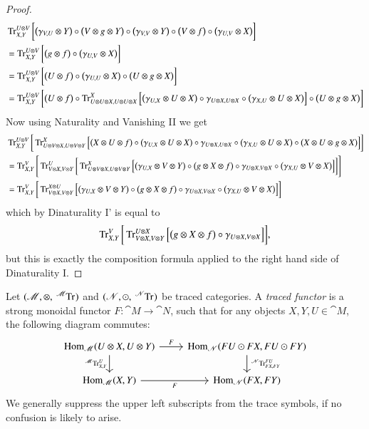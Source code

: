 \documentclass[12pt,oneside,article,draft]{memoir}
\begin{document}
{\begin{proof}
{ \begin{align*}
  &\operatorname{Tr}^{U\otimes V}_{X,Y}\bigg[\big(\gamma_{V,U}\otimes Y\big)\circ\big(V\otimes g\otimes Y\big)\circ\big(\gamma_{V,V}\otimes Y\big)\circ\big(V\otimes f\big)\circ\big(\gamma_{U,V}\otimes X\big)\bigg]\\
  &=\operatorname{Tr}^{U\otimes V}_{X,Y}\bigg[\big(g\otimes f\big)\circ\big(\gamma_{U,V}\otimes X\big)\bigg]\\
  &=\operatorname{Tr}^{U\otimes V}_{X,Y}\bigg[\big(U\otimes f\big)\circ\big(\gamma_{U,U}\otimes X\big)\circ\big(U\otimes g\otimes X\big)\bigg]\\
  &=\operatorname{Tr}^{U\otimes V}_{X,Y}\bigg[\big(U\otimes f\big)\circ\operatorname{Tr}^X_{U\otimes U\otimes X,U\otimes U\otimes X}\Big[\big(\gamma_{U,X}\otimes U\otimes X\big)\circ\gamma_{U\otimes X, U\otimes X}\circ\big(\gamma_{X,U}\otimes U\otimes X\big)\Big]\circ\big(U\otimes g\otimes X\big)\bigg]
 \end{align*}
 Now using Naturality and Vanishing II we get
 \begin{align*}
  &\operatorname{Tr}^{U\otimes V}_{X,Y}\bigg[\operatorname{Tr}^X_{U\otimes V\otimes X,U\otimes V\otimes Y}\Big[\big(X\otimes U\otimes f\big)\circ\big(\gamma_{U,X}\otimes U\otimes X\big)\circ\gamma_{U\otimes X, U\otimes X}\circ\big(\gamma_{X,U}\otimes U\otimes X\big)\circ\big(X\otimes U\otimes g\otimes X\big)\Big]\bigg]\\
  &=\operatorname{Tr}^V_{X,Y}\Bigg[\operatorname{Tr}^U_{V\otimes X,V\otimes Y}\bigg[\operatorname{Tr}^X_{U\otimes V\otimes X,U\otimes V\otimes Y}\Big[\big(\gamma_{U,X}\otimes V\otimes Y\big)\circ\big(g\otimes X\otimes f\big)\circ\gamma_{U\otimes X, V\otimes X}\circ\big(\gamma_{X,U}\otimes V\otimes X\big)\Big]\bigg]\Bigg]\\
  &=\operatorname{Tr}^V_{X,Y}\bigg[\operatorname{Tr}^{X\otimes U}_{V\otimes X,V\otimes Y}\Big[\big(\gamma_{U,X}\otimes V\otimes Y\big)\circ\big(g\otimes X\otimes f\big)\circ\gamma_{U\otimes X, V\otimes X}\circ\big(\gamma_{X,U}\otimes V\otimes X\big)\Big]\bigg]
 \end{align*}
 which by Dinaturality I' is equal to
 \[\operatorname{Tr}^V_{X,Y}\bigg[\operatorname{Tr}^{U\otimes X}_{V\otimes X,V\otimes Y}\Big[\big(g\otimes X\otimes f\big)\circ\gamma_{U\otimes X, V\otimes X}\Big]\bigg],\]
 but this is exactly the composition formula applied to the right hand side of Dinaturality I.}%
\end{proof}
\begin{definition}\label{def:traced functor}
	Let $(\cat{M},\otimes,\tensor*[^{\cat{M}}]{\Tr}{})$ and $(\cat{N},\odot,\tensor*[^{\cat{N}}]{\Tr}{})$ be traced categories.
	A \emph{traced functor} is a strong monoidal functor $F\colon\cat{M}\to\cat{N}$, such that for any objects $X,Y,U\in\cat{M}$, the following diagram commutes:
	$$
	\begin{tikzcd}
		\Hom_{\cat{M}}(U\otimes X,U\otimes Y)
			\rar{F}
			\dar[swap]{\tensor*[^{\cat{M}}]{\Tr}{^U_{X,Y}}}
		& \Hom_{\cat{N}}(FU\odot FX,FU\odot FY)
			\dar{\tensor*[^{\cat{N}}]{\Tr}{^{FU}_{FX,FY}}} \\
		\Hom_{\cat{M}}(X,Y)
			\rar[swap]{F}
		& \Hom_{\cat{N}}(FX,FY)
	\end{tikzcd}
	$$
	We generally suppress the upper left subscripts from the trace symbols, if no confusion is likely to arise.
\end{definition}

}%
\end{document}
